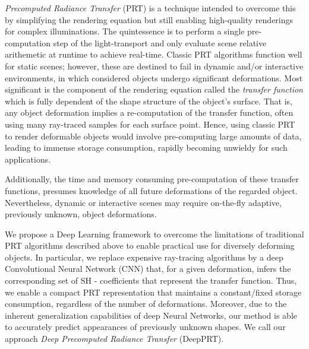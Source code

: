 \textit{Precomputed Radiance Transfer} (PRT) is a technique intended to overcome this by simplifying the rendering equation but still enabling high-quality renderings for complex illuminations. The quintessence is to perform a single pre-computation step of the light-transport and only evaluate scene relative arithemetic at runtime to achieve real-time.
Classic PRT algorithms function well for static scenes; however, these are destined to fail in dynamic and/or interactive environments, in which considered objects undergo significant deformations.
Most significant is the component of the rendering equation called the \textit{transfer function} which is fully dependent of the shape structure of the object's surface. That is, any object deformation implies a re-computation of the transfer function, often using many ray-traced samples for each surface point. Hence, using classic PRT to render deformable objects would involve pre-computing large amounts of data, leading to immense storage consumption, rapidly becoming unwieldy for such applications.

Additionally, the time and memory consuming pre-computation of these transfer functions, presumes knowledge of all future deformations of the regarded object. Nevertheless, dynamic or interactive scenes may require on-the-fly adaptive, previously unknown, object deformations. 

We propose a Deep Learning framework to overcome the limitations of traditional PRT algorithms described above to enable practical use for diversely deforming objects. In particular, we replace expensive ray-tracing algorithms by a deep Convolutional Neural Network (CNN) that, for a given deformation, infers the corresponding set of SH - coefficients that represent the transfer function. 
Thus, we enable a compact PRT representation that maintains a constant/fixed storage consumption, regardless of the number of deformations. Moreover, due to the inherent generalization capabilities of deep Neural Networks, our method is able to accurately predict appearances of previously unknown shapes. We call our approach \textit{Deep Precomputed Radiance Transfer} (DeepPRT). 


